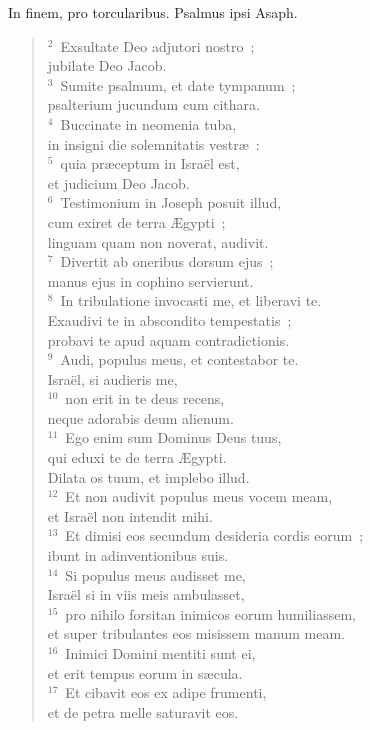 \bchapter
\lettrine[lines=3,image=true,loversize=0.05,lraise=-0.03]{I}{}n finem, pro torcularibus. Psalmus ipsi Asaph.
\begin{flushleft}\begin{verse}\vspace{6pt}${}^{2}$~Exsultate Deo adjutori nostro~;\\ jubilate Deo Jacob.\\
${}^{3}$~Sumite psalmum, et date tympanum~;\\ psalterium jucundum cum cithara.\\
${}^{4}$~Buccinate in neomenia tuba,\\ in insigni die solemnitatis vestr\ae~:\\
${}^{5}$~quia pr\ae ceptum in Isra\"el est,\\ et judicium Deo Jacob.\\
${}^{6}$~Testimonium in Joseph posuit illud,\\ cum exiret de terra \AE gypti~;\\ linguam quam non noverat, audivit.\\
${}^{7}$~Divertit ab oneribus dorsum ejus~;\\ manus ejus in cophino servierunt.\\
${}^{8}$~In tribulatione invocasti me, et liberavi te.\\ Exaudivi te in abscondito tempestatis~;\\ probavi te apud aquam contradictionis.\\
${}^{9}$~Audi, populus meus, et contestabor te.\\ Isra\"el, si audieris me,\\
${}^{10}$~non erit in te deus recens,\\ neque adorabis deum alienum.\\
${}^{11}$~Ego enim sum Dominus Deus tuus,\\ qui eduxi te de terra \AE gypti.\\ Dilata os tuum, et implebo illud.\\
${}^{12}$~Et non audivit populus meus vocem meam,\\ et Isra\"el non intendit mihi.\\
${}^{13}$~Et dimisi eos secundum desideria cordis eorum~;\\ ibunt in adinventionibus suis.\\
${}^{14}$~Si populus meus audisset me,\\ Isra\"el si in viis meis ambulasset,\\
${}^{15}$~pro nihilo forsitan inimicos eorum humiliassem,\\ et super tribulantes eos misissem manum meam.\\
${}^{16}$~Inimici Domini mentiti sunt ei,\\ et erit tempus eorum in s\ae cula.\\
${}^{17}$~Et cibavit eos ex adipe frumenti,\\ et de petra melle saturavit eos.\end{verse}\end{flushleft}



